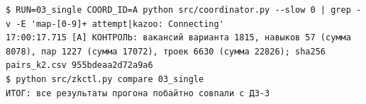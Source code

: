 \begin{Verbatim}
$ RUN=03_single COORD_ID=A python src/coordinator.py --slow 0 | grep -v -E 'map-[0-9]+ attempt|kazoo: Connecting'
17:00:17.715 [A] КОНТРОЛЬ: вакансий варианта 1815, навыков 57 (сумма 8078), пар 1227 (сумма 17072), троек 6630 (сумма 22826); sha256 pairs_k2.csv 955bdeaa2d72a9a6
$ python src/zkctl.py compare 03_single
ИТОГ: все результаты прогона побайтно совпали с ДЗ-3
\end{Verbatim}
